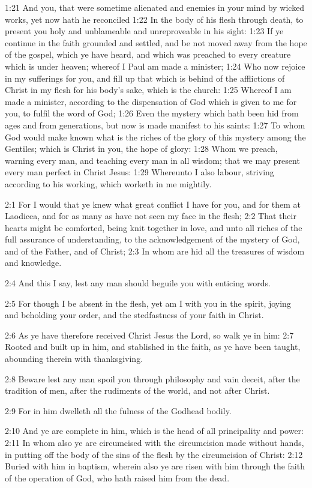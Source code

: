 1:21 And you, that were sometime alienated and enemies in your mind by wicked works, yet now hath he reconciled 1:22 In the body of his flesh through death, to present you holy and unblameable and unreproveable in his sight: 1:23 If ye continue in the faith grounded and settled, and be not moved away from the hope of the gospel, which ye have heard, and which was preached to every creature which is under heaven; whereof I Paul am made a minister; 1:24 Who now rejoice in my sufferings for you, and fill up that which is behind of the afflictions of Christ in my flesh for his body's sake, which is the church: 1:25 Whereof I am made a minister, according to the dispensation of God which is given to me for you, to fulfil the word of God; 1:26 Even the mystery which hath been hid from ages and from generations, but now is made manifest to his saints: 1:27 To whom God would make known what is the riches of the glory of this mystery among the Gentiles; which is Christ in you, the hope of glory: 1:28 Whom we preach, warning every man, and teaching every man in all wisdom; that we may present every man perfect in Christ Jesus: 1:29 Whereunto I also labour, striving according to his working, which worketh in me mightily.

2:1 For I would that ye knew what great conflict I have for you, and for them at Laodicea, and for as many as have not seen my face in the flesh; 2:2 That their hearts might be comforted, being knit together in love, and unto all riches of the full assurance of understanding, to the acknowledgement of the mystery of God, and of the Father, and of Christ; 2:3 In whom are hid all the treasures of wisdom and knowledge.

2:4 And this I say, lest any man should beguile you with enticing words.

2:5 For though I be absent in the flesh, yet am I with you in the spirit, joying and beholding your order, and the stedfastness of your faith in Christ.

2:6 As ye have therefore received Christ Jesus the Lord, so walk ye in him: 2:7 Rooted and built up in him, and stablished in the faith, as ye have been taught, abounding therein with thanksgiving.

2:8 Beware lest any man spoil you through philosophy and vain deceit, after the tradition of men, after the rudiments of the world, and not after Christ.

2:9 For in him dwelleth all the fulness of the Godhead bodily.

2:10 And ye are complete in him, which is the head of all principality and power: 2:11 In whom also ye are circumcised with the circumcision made without hands, in putting off the body of the sins of the flesh by the circumcision of Christ: 2:12 Buried with him in baptism, wherein also ye are risen with him through the faith of the operation of God, who hath raised him from the dead.

